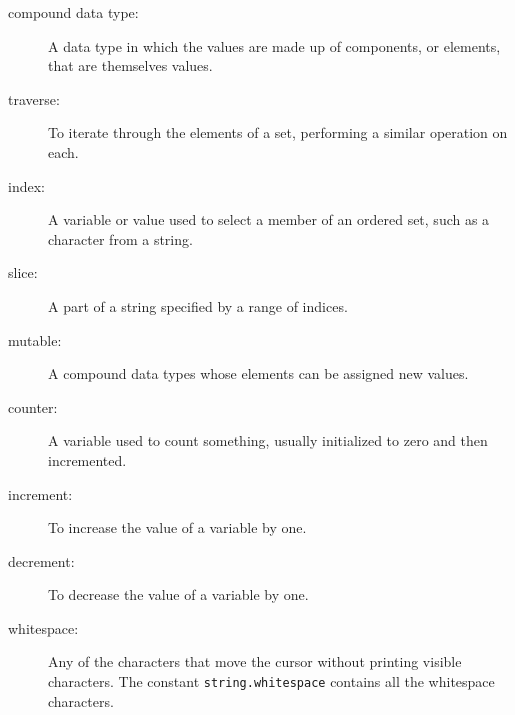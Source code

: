 \begin{description}

\item[compound data type:] A data type in which the values are made
up of components, or elements, that are themselves values.

\item[traverse:] To iterate through the elements of a set,
performing a similar operation on each.

\item[index:] A variable or value used to select a member of an
ordered set, such as a character from a string.

\item[slice:] A part of a string specified by a range of indices.

\item[mutable:] A compound data types whose elements can be assigned
new values.

\item[counter:] A variable used to count something, usually initialized
to zero and then incremented.

\item[increment:] To increase the value of a variable by one.

\item[decrement:] To decrease the value of a variable by one.

\item[whitespace:] Any of the characters that move the cursor without
printing visible characters.  The constant
{\tt string.whitespace}
contains all the white\-space characters.


\end{description}
